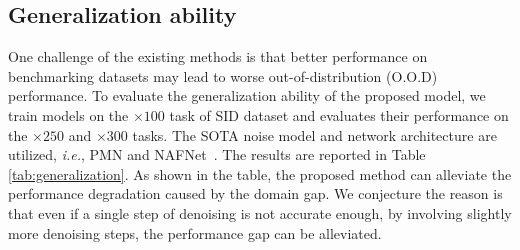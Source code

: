 \documentclass[10pt,twocolumn,letterpaper]{article}
\def\ie{\textit{i.e.}}
\begin{document}
\subsection{Generalization ability}
\vspace{-0.05cm}
One challenge of the existing methods is that better performance on benchmarking datasets may lead to worse out-of-distribution (O.O.D) performance. To evaluate the generalization ability of the proposed model, we train models on the $\times 100$ task of SID dataset \cite{chen2018learning} and evaluates their performance on the $\times 250$ and $\times 300$ tasks. The SOTA noise model and network architecture are utilized, \ie, PMN \cite{feng2022learnability} and NAFNet~\cite{chen2022simple}. The results are reported in Table \ref{tab:generalization}. As shown in the table, the proposed method can alleviate the performance degradation caused by the domain gap. We conjecture the reason is that even if a single step of denoising is not accurate enough, by involving slightly more denoising steps, the performance gap can be alleviated.   

\begin{table}[tbp]
    \centering


    \vspace{-0.1cm}
    \caption{The generalization ability of methods on O.O.D tasks. The models are trained on the $\times 100$ task and evaluated on $\times 250$ and $\times 300$ tasks. All the models use the same SOTA noise model PMN~\cite{feng2022learnability} and backbone NAFNet-2~\cite{chen2022simple}. \textit{Baseline} is not equipped with the improved architecture and the proposed training paradigm.}
    \label{tab:generalization}
    \vspace{-0.3cm}
\end{table}

\vspace{-0.1cm}
\end{document}
